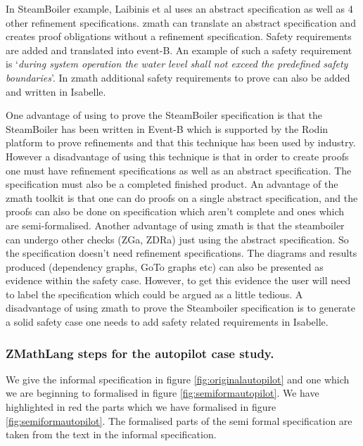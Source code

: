 In \cite{laibinis} SteamBoiler example, Laibinis et al uses an abstract specification as well as 
4 other refinement specifications. \Gls{zmath} can translate an abstract specification and creates 
proof obligations without a refinement specification. Safety requirements are added and translated 
into event-B. An example of such a safety requirement is `\textit{during system operation the water level shall not exceed the
predefined safety boundaries}'. In \gls{zmath} additional safety requirements to prove can also be added
and written in Isabelle.

One advantage of using \cite{laibinis} to prove the SteamBoiler specification is that the SteamBoiler
has been written in Event-B which is supported by the Rodin platform to prove refinements and
 that this technique has been used by industry.
 However a disadvantage of using this technique is that in order to create proofs one must have refinement
 specifications as well as an abstract specification. The specification must also be a completed finished product.
 An advantage of the \gls{zmath} toolkit is that one can do proofs on a single abstract specification, and the 
 proofs can also be done on specification which aren't complete and ones which are semi-formalised.
 Another advantage of using \gls{zmath} is that the steamboiler can undergo other checks (ZGa, ZDRa) just
 using the abstract specification. So the specification doesn't need refinement specifications. The diagrams
 and results produced (dependency graphs, GoTo graphs etc) can also be presented as evidence within the safety case.
 However, to get this evidence the user will need to label the specification which could be argued as a little tedious.
 A disadvantage of using \gls{zmath} to prove the Steamboiler specification is to generate a solid safety case
 one needs to add safety related requirements in Isabelle.

\subsubsection{ZMathLang steps for the autopilot case study.}

We give the informal specification in figure \ref{fig:originalautopilot} and one
which we are beginning to formalised in figure \ref{fig:semiformautopilot}. We
have highlighted in {\color{set}red} the parts which we have formalised in
figure \ref{fig:semiformautopilot}. The formalised parts of the semi formal
specification are taken from the text in the informal specification.

